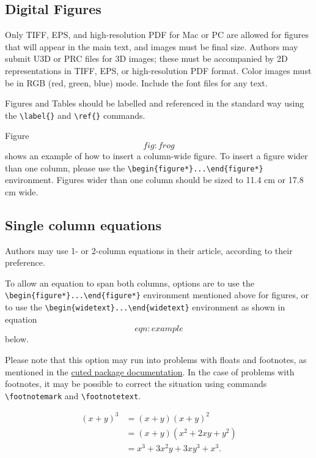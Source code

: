\documentclass[9pt,twocolumn,twoside,]{pnas-new}
\begin{document}
\hypertarget{sec:figures}{%
\subsection*{Digital Figures}\label{sec:figures}}

Only TIFF, EPS, and high-resolution PDF for Mac or PC are allowed for
figures that will appear in the main text, and images must be final
size. Authors may submit U3D or PRC files for 3D images; these must be
accompanied by 2D representations in TIFF, EPS, or high-resolution PDF
format. Color images must be in RGB (red, green, blue) mode. Include the
font files for any text.

Figures and Tables should be labelled and referenced in the standard way
using the \texttt{\textbackslash{}label\{\}} and
\texttt{\textbackslash{}ref\{\}} commands.

Figure \[fig:frog\] shows an example of how to insert a column-wide
figure. To insert a figure wider than one column, please use the
\texttt{\textbackslash{}begin\{figure*\}...\textbackslash{}end\{figure*\}}
environment. Figures wider than one column should be sized to 11.4 cm or
17.8 cm wide.

\hypertarget{single-column-equations}{%
\subsection*{Single column equations}\label{single-column-equations}}

Authors may use 1- or 2-column equations in their article, according to
their preference.

To allow an equation to span both columns, options are to use the
\texttt{\textbackslash{}begin\{figure*\}...\textbackslash{}end\{figure*\}}
environment mentioned above for figures, or to use the
\texttt{\textbackslash{}begin\{widetext\}...\textbackslash{}end\{widetext\}}
environment as shown in equation \[eqn:example\] below.

Please note that this option may run into problems with floats and
footnotes, as mentioned in the \href{http://texdoc.net/pkg/cuted}{cuted
package documentation}. In the case of problems with footnotes, it may
be possible to correct the situation using commands
\texttt{\textbackslash{}footnotemark} and
\texttt{\textbackslash{}footnotetext}.

\[\begin{aligned}
(x+y)^3&=(x+y)(x+y)^2\\
       &=(x+y)(x^2+2xy+y^2) \label{eqn:example} \\
       &=x^3+3x^2y+3xy^3+x^3. 
\end{aligned}\]
\end{document}

